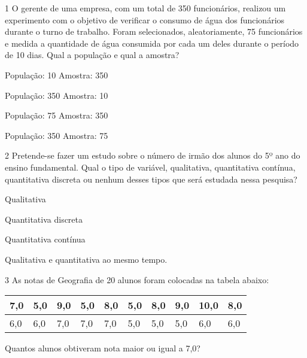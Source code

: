 

\num{1} O gerente de uma empresa, com um total de 350 funcionários,
realizou um experimento com o objetivo de verificar o consumo de água
dos funcionários durante o turno de trabalho. Foram selecionados,
aleatoriamente, 75 funcionários e medida a quantidade de água consumida
por cada um deles durante o período de 10 dias. Qual a população e qual
a amostra?

\begin{escolha}
\item
  População: 10 Amostra: 350
\item
  População: 350 Amostra: 10
\item
  População: 75 Amostra: 350
\item
  População: 350 Amostra: 75
\end{escolha}


\num{2} Pretende-se fazer um estudo sobre o número de irmão dos alunos do
5º ano do ensino fundamental. Qual o tipo de variável, qualitativa,
quantitativa contínua, quantitativa discreta ou nenhum desses tipos que
será estudada nessa pesquisa?

\begin{escolha}
\item
  Qualitativa
\item
  Quantitativa discreta
\item
  Quantitativa contínua
\item
  Qualitativa e quantitativa ao mesmo tempo.
\end{escolha}


\num{3} As notas de Geografia de 20 alunos foram colocadas na tabela
abaixo:

\begin{longtable}[]{@{}llllllllll@{}}
\toprule
7,0 & 5,0 & 9,0 & 5,0 & 8,0 & 5,0 & 8,0 & 9,0 & 10,0 &
8,0\tabularnewline
\midrule
\endhead
6,0 & 6,0 & 7,0 & 7,0 & 7,0 & 5,0 & 5,0 & 5,0 & 6,0 & 6,0\tabularnewline
\bottomrule
\end{longtable}

Quantos alunos obtiveram nota maior ou igual a 7,0?

